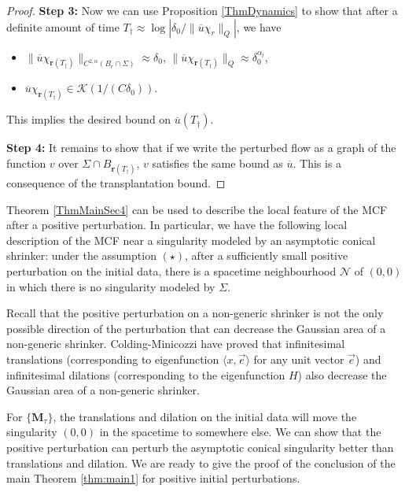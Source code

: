 \documentclass[12pt]{amsart}
\numberwithin{equation}{section}
\numberwithin{equation}{section}
\newcommand{\cN}{\mathcal{N}}
\newcommand{\cK}{\mathcal{K}}
\begin{document}
\begin{proof}
		{\bf Step 3:} 
		Now we can use Proposition \ref{ThmDynamics} to show that after a definite amount of time $T_\dagger\approx \log|\delta_0/\|\overline{u}\chi_r\|_{Q}|$, we have 
		\begin{itemize}
			\item $\|\overline{u}\chi_{\mathbf{r}({T_\dagger})}\|_{C^{2,\alpha}(B_r\cap\Sigma)}\approx\delta_0$, $\|\overline{u}\chi_{\mathbf{r}({T_\dagger})}\|_{Q}\approx\delta_0^{\alpha_l}$, 
			\item $\overline{u}\chi_{\mathbf{r}({T_\dagger})}\in\cK(1/(C\delta_0))$.
		\end{itemize}
		This implies the desired bound on $\overline{u}(T_\dagger)$.
		
		{\bf Step 4:}
		It remains to show that if we write the perturbed flow as a graph of the function $v$ over $\Sigma\cap B_{\mathbf{r}({T_\dagger})}$, $v$ satisfies the same bound as $\overline{u}$. This is a consequence of the transplantation bound. 
		
		
	\end{proof}
	
	Theorem \ref{ThmMainSec4} can be used to describe the local feature of the MCF after a positive perturbation. In particular, we have the following local description of the MCF near a singularity modeled by an asymptotic conical shrinker: under the assumption $(\star)$, after a sufficiently small positive perturbation on the initial data, there is a spacetime neighbourhood $\cN$ of $(0,0)$ in which there is no singularity modeled by $\Sigma$.
	
	Recall that the positive perturbation on a non-generic shrinker is not the only possible direction of the perturbation that can decrease the Gaussian area of a non-generic shrinker. Colding-Minicozzi \cite{CM1} have proved that infinitesimal translations (corresponding to eigenfunction $\langle x,\vec e\rangle$ for any unit vector $\vec{e}$) and infinitesimal dilations (corresponding to the eigenfunction $H$) also decrease the Gaussian area of a non-generic shrinker. 
	
	For $\{\mathbf{M}_\tau\}$, the translations and dilation on the initial data will move the singularity $(0,0)$ in the spacetime to somewhere else. We can show that the positive perturbation can perturb the asymptotic conical singularity better than translations and dilation. We are ready to give the proof of the conclusion of the main Theorem \ref{thm:main1} for positive initial perturbations.
	
\end{document}
